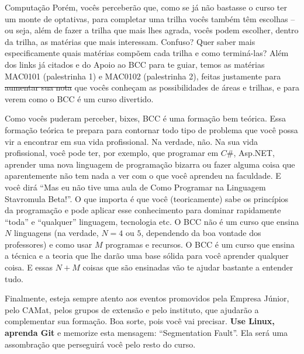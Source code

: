 \begin{subsecao}{Computação}
Porém, vocês perceberão que, como se já não bastasse o curso ter um monte de
optativas, para completar uma trilha vocês também têm escolhas -- ou seja,
além de fazer a trilha que mais lhes agrada, vocês podem escolher, dentro da
trilha, as matérias que mais interessam. Confuso? Quer saber mais
especificamente quais matérias compõem cada trilha e como terminá-las? Além
dos links já citados e do Apoio ao BCC para te guiar, temos as matérias MAC0101
(palestrinha 1) e MAC0102 (palestrinha 2), feitas justamente para
\sout{aumentar sua nota} que vocês conheçam as possibilidades de áreas e
trilhas, e para verem como o BCC é um curso divertido.

Como vocês puderam perceber, bixes, BCC é uma formação bem teórica. Essa
formação teórica te prepara para contornar todo tipo de problema que você
possa vir a encontrar em sua vida profissional. Na verdade, não. Na sua vida
profissional, você pode ter, por exemplo, que programar em $C\#$, Asp.NET,
aprender uma nova linguagem de programação bizarra ou fazer alguma coisa que
aparentemente não tem nada a ver com o que você aprendeu na faculdade. E você
dirá ``Mas eu não tive uma aula de Como Programar na Linguagem Stavromula
Beta!''. O que importa é que você (teoricamente) sabe os princípios da
programação e pode aplicar esse conhecimento para dominar rapidamente ``toda''
e ``qualquer'' linguagem, tecnologia etc. O BCC não é um curso que ensina $N$
linguagens (na verdade, $N = 4$ ou $5$, dependendo da boa vontade dos
professores) e como usar $M$ programas e recursos. O BCC é um curso que ensina
a técnica e a teoria que lhe darão uma base sólida para você aprender qualquer
coisa. E essas $N + M$ coisas que são ensinadas vão te ajudar bastante a
entender tudo.

Finalmente, esteja sempre atento aos eventos promovidos pela Empresa Júnior,
pelo CAMat, pelos grupos de extensão e pelo instituto, que ajudarão a
complementar sua formação. Boa sorte, pois você vai precisar. \textbf{Use
Linux, aprenda Git} e memorize esta mensagem: ``Segmentation Fault''. Ela será
uma assombração que perseguirá você pelo resto do curso.

\end{subsecao}
